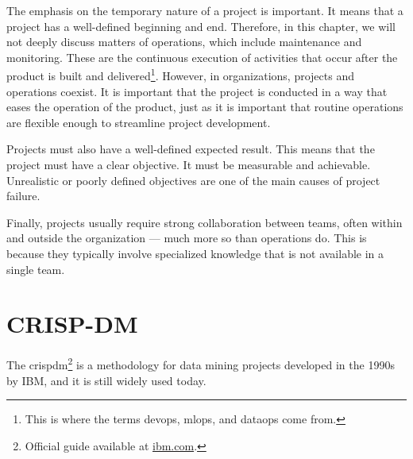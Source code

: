 The emphasis on the temporary nature of a project is important.  It means that a project
has a well-defined beginning and end.  Therefore, in this chapter, we will not deeply
discuss matters of operations, which include maintenance and monitoring.  These are the
continuous execution of activities
that occur after the product is built and delivered\footnote{This is where the terms
\gls{devops}, \gls{mlops}, and \gls{dataops} come from.}.  However, in organizations, projects and
operations coexist.  It is important that the project is conducted in a way that eases
the operation of the product, just as it is important that routine operations are flexible
enough to streamline project development.

Projects must also have a well-defined expected result.  This means that the project must
have a clear objective.  It must be measurable and achievable.  Unrealistic or poorly
defined objectives are one of the main causes of project failure.

Finally, projects usually require strong collaboration between teams, often within and
outside the organization --- much more so than operations do.  This is because they
typically involve specialized knowledge that is not available in a single team.

\section{CRISP-DM}

The \gls{crispdm}\footnote{Official guide available at
\href{https://www.ibm.com/docs/it/SS3RA7_18.3.0/pdf/ModelerCRISPDM.pdf}{ibm.com}.} is a
methodology for data mining projects developed in the 1990s by IBM, and it is still widely
used today.

